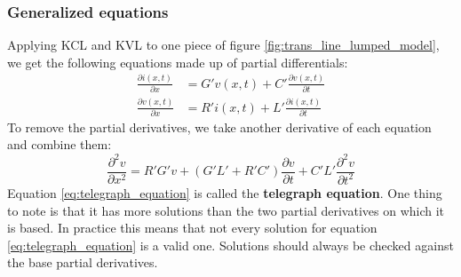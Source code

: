 \documentclass[../transmission.tex]{subfiles}
\begin{document}
			\subsubsection{Generalized equations}
				Applying KCL and KVL to one piece of figure \ref{fig:trans_line_lumped_model}, we get the following equations made up of partial differentials:
				\begin{align}
					\frac{\partial i(x,t)}{\partial x}&=G' v(x,t) + C'\frac{\partial v(x,t)}{\partial t}\\
					\frac{\partial v(x,t)}{\partial x}&= R' i(x,t)+L'\frac{\partial i(x,t)}{\partial t}
				\end{align}
				To remove the partial derivatives, we take another derivative of each equation and combine them:
				\begin{equation}
					\frac{\partial^2v}{\partial x^2} = R'G'v+(G'L'+R'C')\frac{\partial v}{\partial t}+C'L'\frac{\partial^2v}{\partial t^2}
					\label{eq:telegraph_equation}
				\end{equation}
				Equation \ref{eq:telegraph_equation} is called the \textbf{telegraph equation}. One thing to note is that it has more solutions than the two partial derivatives on which it is based. In practice this means that not every solution for equation \ref{eq:telegraph_equation} is a valid one. Solutions should always be checked against the base partial derivatives.
\end{document}
